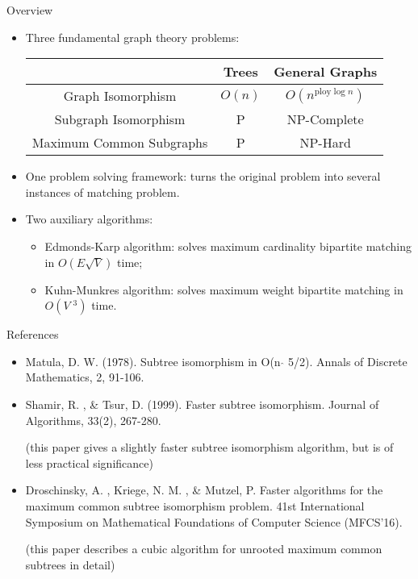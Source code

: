 \documentclass{beamer}
\begin{document}
\begin{frame}{Overview}

\begin{itemize}
\item Three fundamental graph theory problems:
\begin{table}
	\centering
	\begin{tabular}{|c|c|c|}
		\hline 
		& Trees & General Graphs \\ 
		\hline 
		Graph Isomorphism & $O(n)$ & $O(n^{\text{ploy}\log n})$ \\ 
		\hline 
		Subgraph Isomorphism & P & NP-Complete \\ 
		\hline 
		Maximum Common Subgraphs & P & NP-Hard \\
		\hline 
	\end{tabular} 
\end{table}
\item One problem solving framework: turns the original problem into several instances of matching problem.
\item Two auxiliary algorithms:
\begin{itemize}
	\item Edmonds-Karp algorithm: solves maximum cardinality bipartite matching in $O(E\sqrt{V})$ time;
	\item Kuhn-Munkres algorithm: solves maximum weight bipartite matching in $O(V\;^3)$ time.
\end{itemize}
\end{itemize}
\end{frame}

\begin{frame}{References}
\begin{itemize}
\item Matula, D. W. (1978). Subtree isomorphism in O(n $\hat{}$ 5/2). Annals of Discrete Mathematics, 2, 91-106.

\item Shamir, R. , \& Tsur, D. (1999). Faster subtree isomorphism. Journal of Algorithms, 33(2), 267-280.

(this paper gives a slightly faster subtree isomorphism algorithm, but is of less practical significance)

\item Droschinsky, A. , Kriege, N. M. , \& Mutzel, P. Faster algorithms for the maximum common subtree isomorphism problem. 41st International Symposium on Mathematical Foundations of Computer Science (MFCS'16).

(this paper describes a cubic algorithm for unrooted maximum common subtrees in detail)
\end{itemize}
\end{frame}
\end{document}
